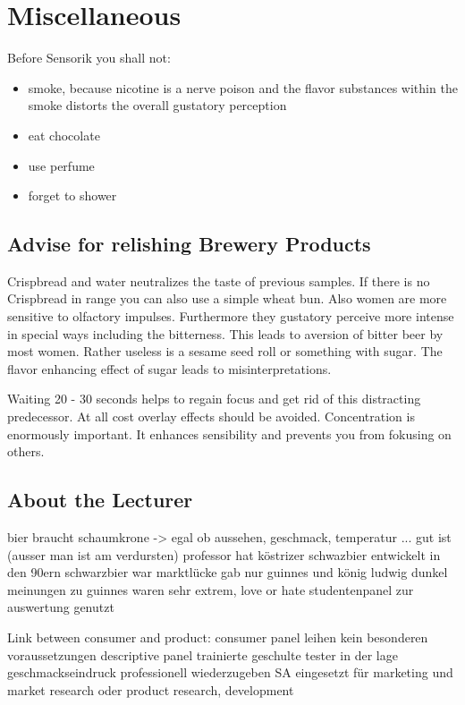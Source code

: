 \documentclass[]{scrartcl}
\begin{document}
\newpage
\section{Miscellaneous}
Before Sensorik you shall not:
\begin{itemize}
  \item smoke, because nicotine is a nerve poison and the flavor substances within
  the smoke distorts the overall gustatory perception
  \item eat chocolate
  \item use perfume
  \item forget to shower
\end{itemize}

\subsection{Advise for relishing Brewery Products}
Crispbread and water neutralizes the taste of previous samples. If there is no Crispbread in range
you can also use a simple wheat bun.
Also women are more sensitive to olfactory impulses. Furthermore they gustatory perceive
more intense in special ways including the bitterness. This leads to aversion of bitter beer
by most women. Rather useless is a sesame seed roll or something with sugar.
The flavor enhancing effect of sugar leads to misinterpretations.

Waiting 20 - 30 seconds helps to regain focus and get rid of this distracting predecessor.
At all cost overlay effects should be avoided.
Concentration is enormously important. It enhances sensibility and prevents
you from fokusing on others.

\subsection{About the Lecturer}
bier braucht schaumkrone -> egal ob aussehen, geschmack, temperatur ... gut ist (ausser man ist am verdursten)
professor hat köstrizer schwazbier entwickelt in den 90ern
	schwarzbier war marktlücke
	gab nur guinnes und könig ludwig dunkel
		meinungen zu guinnes waren sehr extrem, love or hate
	studentenpanel zur auswertung genutzt



Link between consumer and product:
consumer panel
	leihen
	kein besonderen voraussetzungen
descriptive panel
	trainierte geschulte tester
	in der lage geschmackseindruck professionell wiederzugeben
SA eingesetzt für marketing und market research oder product research, development
\end{document}
